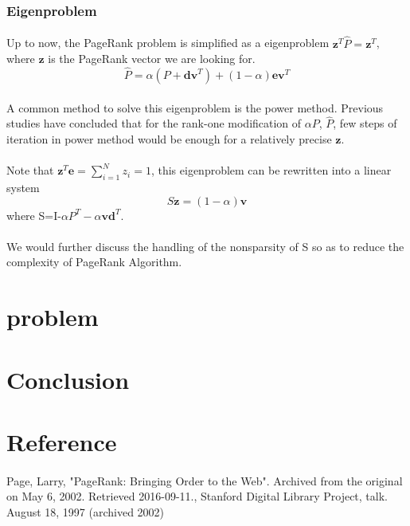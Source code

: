 \documentclass{article}
\begin{document}
        \subsubsection{Eigenproblem}
        \paragraph{}
        Up to now, the PageRank problem is simplified as a eigenproblem $\textbf{z}^T\hat{P}=\textbf{z}^T$, where $\textbf{z}$ is the PageRank vector we are looking for.
        $$\hat{P}=\alpha(P+\textbf{dv}^T)+(1-\alpha)\textbf{ev}^T$$
        \paragraph{}
        A common method to solve this eigenproblem is the power method. Previous studies have concluded that for the rank-one modification of $\alpha P$, $\hat{P}$, few steps of iteration in power method would be enough for a relatively precise $\textbf{z}$.
        \paragraph{}
        Note that $\textbf{z}^T\textbf{e}=\sum^N_{i=1}z_i=1$,
        this eigenproblem can be rewritten into a linear system
        $$S\textbf{z}=(1-\alpha)\textbf{v}$$
        where S=I-$\alpha P^T-\alpha\textbf{vd}^T$.
        \paragraph{}
        We would further discuss the handling of the nonsparsity of S so as to reduce the complexity of PageRank Algorithm.
    \section{problem}
    \section{Conclusion}
    \section{Reference}

\paragraph{}
Page, Larry, "PageRank: Bringing Order to the Web". 
Archived from the original on May 6, 2002. Retrieved 2016-09-11., 
Stanford Digital Library Project, talk. August 18, 1997 (archived 2002)
\end{document}
